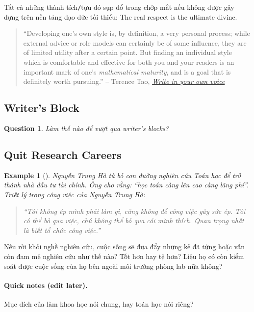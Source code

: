 \documentclass{article}
\numberwithin{equation}{section}
\newtheorem{example}{Example}[section]
\newtheorem{question}{Question}[section]
\begin{document}
Tất cả những thành tích\texttt{/}tựu đó sụp đổ trong chớp mắt nếu không được gây dựng trên nền tảng đạo đức tối thiểu: The real respect is the ultimate divine.
\begin{quotation}
	``Developing one's own style is, by definition, a very personal process; while external advice or role models can certainly be of some influence, they are of limited utility after a certain point. But finding an individual style which is comfortable and effective for both you and your readers is an important mark of one's \textit{mathematical maturity}, and is a goal that is definitely worth pursuing.'' -- Terence Tao, \href{https://terrytao.wordpress.com/advice-on-writing-papers/write-in-your-own-voice/}{\textit{Write in your own voice}}
\end{quotation}

\subsection{Writer's Block}
\begin{question}
	Làm thế nào để vượt qua writer's blocks?
\end{question}

\subsection{Quit Research Careers}

\begin{example}[\cite{VNE/NTH}]
	Nguyễn Trung Hà từ bỏ con đường nghiên cứu Toán học để trở thành nhà đầu tư tài chính. Ông cho rằng: ``học toán càng lên cao càng lãng phí''. Triết lý trong công việc của Nguyễn Trung Hà:
	\begin{quotation}
		``Tôi không ép mình phải làm gì, cũng không để công việc gây sức ép. Tôi có thể bỏ qua việc, chứ không thể bỏ qua cái mình thích. Quan trọng nhất là biết tổ chức công việc.''
	\end{quotation}
	
\end{example}
Nếu rời khỏi nghề nghiên cứu, cuộc sống sẽ đưa đẩy những kẻ đã từng hoặc vẫn còn đam mê nghiên cứu như thế nào? Tốt hơn hay tệ hơn? Liệu họ có còn kiểm soát được cuộc sống của họ bên ngoài môi trường phòng lab nữa không?


\paragraph{Quick notes (edit later).}
Mục đích của làm khoa học nói chung, hay toán học nói riêng?
\end{document}
